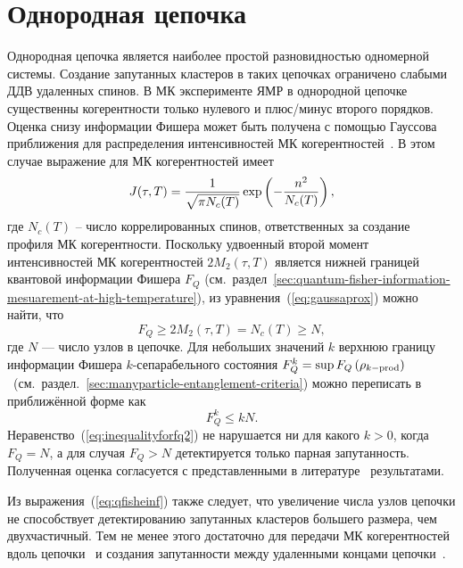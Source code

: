 \section{Однородная цепочка}
Однородная цепочка является наиболее простой разновидностью одномерной системы.
Создание запутанных кластеров в таких цепочках ограничено слабыми ДДВ удаленных спинов.
В МК эксперименте ЯМР в однородной цепочке существенны когерентности только нулевого и плюс/минус второго порядков.
Оценка снизу информации Фишера может быть получена с помощью Гауссова приближения для распределения интенсивностей МК когерентностей~\cite{Baum1985}.
В этом случае выражение для МК когерентностей имеет
%
\begin{equation}\label{eq:gaussaprox}
  J(\tau, T)=\dfrac{1}{\sqrt{\pi N_c(T)}} \exp\left( -\frac{n^2}{N_c(T)} \right),
\end{equation}
%
где $N_c(T)$ -- число коррелированных спинов,
ответственных за создание профиля МК когерентности.
Поскольку удвоенный второй момент интенсивностей МК когерентностей $2M_2(\tau, T)$ является нижней границей квантовой информации Фишера $F_Q$
(см.~раздел~\ref{sec:quantum-fisher-information-mesuarement-at-high-temperature}),
из уравнения~(\ref{eq:gaussaprox}) можно найти, что
%
\begin{equation}\label{eq:qfisheinf}
  F_Q \geq 2M_2(\tau, T) = N_c(T) \geq N,
\end{equation}
%
где $N$ --- число узлов в цепочке.
Для небольших значений $k$ верхнюю границу информации Фишера $k$-сепарабельного состояния
$F^k_Q = \sup{F_Q\left( \rho_{k-\mathrm{prod}} \right)}$~(см.~раздел.~\ref{sec:manyparticle-entanglement-criteria}) можно переписать в приближённой форме как
%
\begin{equation}\label{eq:inequalityforfq2}
  F^k_Q \leq k N.
\end{equation}
%
Неравенство~(\ref{eq:inequalityforfq2}) не нарушается ни для какого $k > 0$, когда $F_Q = N$,
а для случая $F_Q > N$ детектируется только парная запутанность.
Полученная оценка согласуется с представленными в литературе~\cite{Doronin2007, Feldman2012} результатами.

Из выражения~(\ref{eq:qfisheinf}) также следует,
что увеличение числа узлов цепочки не способствует детектированию запутанных кластеров большего размера, чем двухчастичный.
Тем не менее этого достаточно для передачи МК когерентностей вдоль цепочки~\cite{Bochkin2018qip} и создания запутанности между удаленными концами цепочки~\cite{Lazarev2019}.

